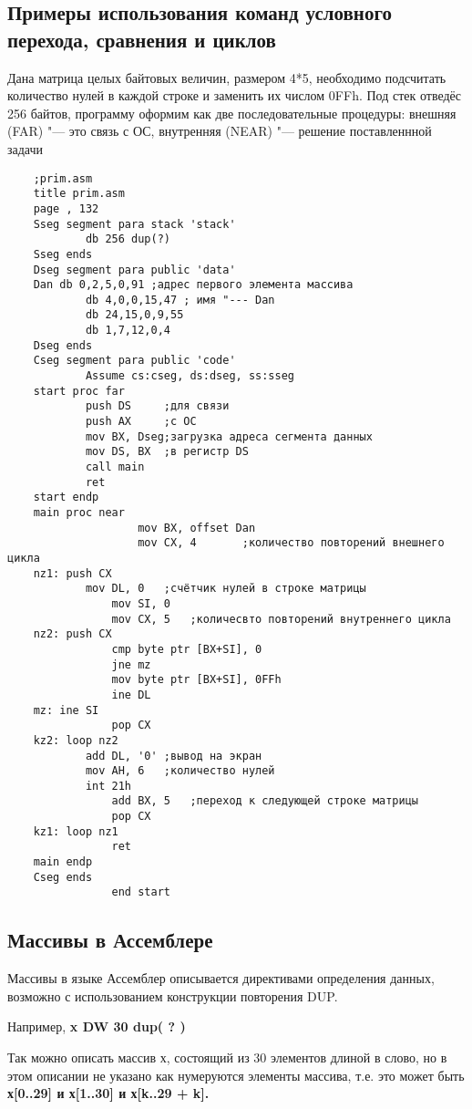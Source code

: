 \subsection{Примеры использования команд условного перехода, сравнения и циклов}
Дана матрица целых байтовых величин, размером 4*5, необходимо подсчитать количество нулей в каждой строке и заменить их числом 0FFh. Под стек отведёс 256 байтов, программу оформим как две последовательные процедуры: внешняя (FAR) "--- это связь с ОС, внутренняя (NEAR) "--- решение поставленнной задачи
\begin{verbatim}
    ;prim.asm
    title prim.asm
    page , 132
    Sseg segment para stack 'stack'
            db 256 dup(?)
    Sseg ends
    Dseg segment para public 'data'
    Dan db 0,2,5,0,91 ;адрес первого элемента массива
            db 4,0,0,15,47 ; имя "--- Dan
            db 24,15,0,9,55
            db 1,7,12,0,4
    Dseg ends
    Cseg segment para public 'code'
            Assume cs:cseg, ds:dseg, ss:sseg
    start proc far 
            push DS     ;для связи
            push AX     ;с ОС
            mov BX, Dseg;загрузка адреса сегмента данных
            mov DS, BX  ;в регистр DS
            call main
            ret
    start endp
    main proc near 
                    mov BX, offset Dan
                    mov CX, 4       ;количество повторений внешнего цикла
    nz1: push CX
            mov DL, 0   ;счётчик нулей в строке матрицы
                mov SI, 0
                mov CX, 5   ;количесвто повторений внутреннего цикла
    nz2: push CX
                cmp byte ptr [BX+SI], 0
                jne mz
                mov byte ptr [BX+SI], 0FFh
                ine DL
    mz: ine SI
                pop CX
    kz2: loop nz2
            add DL, '0' ;вывод на экран
            mov AH, 6   ;количество нулей
            int 21h
                add BX, 5   ;переход к следующей строке матрицы
                pop CX
    kz1: loop nz1
                ret
    main endp
    Cseg ends
                end start
\end{verbatim}

\subsection{Массивы в Ассемблере}
Массивы в языке Ассемблер описывается директивами определения данных, возможно с использованием конструкции повторения DUP.

Например, \textbf{x DW 30 dup( ? )}

Так можно описать массив х, состоящий из 30 элементов длиной в слово, но в этом описании не указано как нумеруются элементы массива, т.е. это может быть \textbf{х[0..29] и х[1..30] и х[k..29 + k].}

